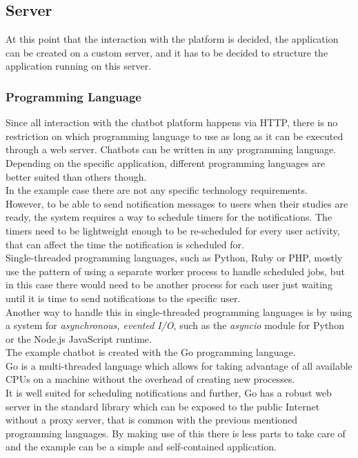 \subsection{Server}

At this point that the interaction with the platform is decided, the application can be created on a custom server,
and it has to be decided to structure the application running on this server.


\subsubsection{Programming Language}

Since all interaction with the chatbot platform happens via HTTP,
there is no restriction on which programming language to use as long as it can be executed through a web server.
Chatbots can be written in any programming language.
\\
Depending on the specific application, different programming languages are better suited than others though.
\\

In the example case there are not any specific technology requirements.
\\
However, to be able to send notification messages to users when their studies are ready,
the system requires a way to schedule timers for the notifications.
The timers need to be lightweight enough to be re-scheduled for every user activity,
that can affect the time the notification is scheduled for.
\\
Single-threaded programming languages, such as Python, Ruby or PHP,
mostly use the pattern of using a separate worker process to handle scheduled jobs,
but in this case there would need to be another process for each user
just waiting until it is time to send notifications to the specific user.
\\
Another way to handle this in single-threaded programming languages is by using a system for \emph{asynchronous, evented I/O},
such as the \emph{asyncio} module for Python\cite{asyncio} or the Node.js JavaScript runtime\cite{nodejs}.
\\

The example chatbot is created with the Go programming language\cite{golang}.
\\
Go is a multi-threaded language which allows for taking advantage of all available CPUs
on a machine without the overhead of creating new processes.
\\
It is well suited for scheduling notifications and further, Go has a robust web server in the standard library which can be exposed to the public Internet without a proxy server, that is common with the previous mentioned programming languages.
By making use of this there is less parts to take care of and the example can be a simple and self-contained application.
\\


